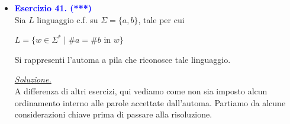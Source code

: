 \documentclass[a4paper,10pt]{article}
\makeatletter
\newcommand{\EsercitazioneNum}{04}
\newcommand{\Data}{16/10/2025}
\newcommand{\DocType}{Esercitazione} %
\newcommand{\FullTitle}{\DocType\ \EsercitazioneNum}
\newcommand{\Header}{
\noindent
  \small \textbf{Computabilità, Complessità e Logica - a.a. 2025/26} \hfill \textbf{\FullTitle} \\[0.2cm]
  \scriptsize Matteo Liotta, \texttt{matteo.liotta@studenti.units.it} \hfill \Data \\[0.2cm]
  \noindent\makebox[\linewidth]{\rule{\linewidth}{0.4pt}} \\[0.3cm]}
\newcommand{\NewPageHeader}{
  \vfill
  \noindent\makebox[\linewidth]{\rule{\linewidth}{0.4pt}}
  \newpage
  {\Header}
}
\makeatother
\begin{document}
{\begin{itemize}[label=, leftmargin=0pt]
\begin{osservazioni}
    \underline{\textit{Soluzione.}}\\
    Dapprima si simuli la lettura e l'inserimento in stack:
    \begin{enumerate}
        \item Situazione iniziale con\\ \texttt{Stack: [] }
        \item \texttt{Letto: $\epsilon$} \texttt{Stack: [\$] }
        \item \texttt{Letto: 0} \texttt{Stack: [\$] }
        \item \texttt{Letto: 1} \texttt{Stack: [\$,I] }
        \item \texttt{Letto: 0} \texttt{Stack: [\$,I] }
        \item Loop di letture che inseriscono una $I$ ad ogni lettura di un $1$.
    \end{enumerate}
    Si osserva come il all'inizio le parole sono della forma $0101$ e possono essere seguite da $(01)$ per un numero arbitrario di volte. Alla fine, devono essere letti tanti zero quanti simboli $I$ sono stati inseriti. Poiché inserito uno ad ogni lettura di 1, allora il loop deve essere eseguito in numero uguale al numero di 1 prima inseriti. Dunque

    $$w\in L \Leftrightarrow w=0101(01)^n0^{n+2}, \quad n\ge0 $$

    
\end{osservazioni}

\NewPageHeader

    \item \textcolor{blue}{\textbf{Esercizio 41. (***)}}\\ 
    Sia $L$ linguaggio c.f. su $\Sigma=\{a,b\}$, tale per cui 
    {\begin{center}
        $L = \{ w\in \Sigma^* \mid \#a = \#b \text{\ in\ }w \}$\\
    \end{center}}
    Si rappresenti l'automa a pila che riconosce tale linguaggio.\\

    \begin{osservazioni}
        \underline{\textit{Soluzione.}}\\
        A differenza di altri esercizi, qui vediamo come non sia imposto alcun ordinamento interno alle parole accettate dall'automa. Partiamo da alcune considerazioni chiave prima di passare alla risoluzione. 


\end{osservazioni}
\end{itemize}}
\end{document}
